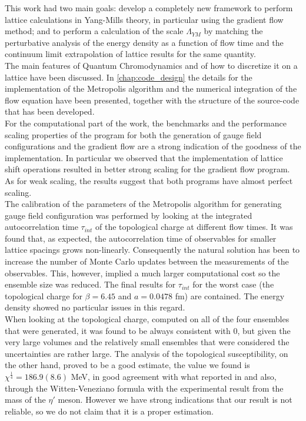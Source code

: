 This work had two main goals: develop a completely new framework to perform lattice calculations in Yang-Mills theory, in particular using the gradient flow method; and to perform a calculation of the scale $\Lambda_{YM}$ by matching the perturbative analysis of the energy density as a function of flow time and the continuum limit extrapolation of lattice results for the same quantity.\\

The main features of Quantum Chromodynamics and of how to discretize it on a lattice have been discussed. In \cref{chap:code_design} the details for the implementation of the Metropolis algorithm and the numerical integration of the flow equation have been presented, together with the structure of the source-code that has been developed. \\
For the computational part of the work, the benchmarks and the performance scaling properties of the program for both the generation of gauge field configurations and the gradient flow are a strong indication of the goodness of the implementation. In particular we observed that the implementation of lattice shift operations resulted in better strong scaling for the gradient flow program. As for weak scaling, the results suggest that both programs have almost perfect scaling. \\
The calibration of the parameters of the Metropolis algorithm for generating gauge field configuration was performed by looking at the integrated autocorrelation time $\tau_{int}$ of the topological charge at different flow times. It was found that, as expected, the autocorrelation time of observables for smaller lattice spacings grows non-linearly. Consequently the natural solution has been to increase the number of Monte Carlo updates between the measurements of the observables. This, however, implied a much larger computational cost so the ensemble size was reduced. The final results for $\tau_{int}$ for the worst case (the topological charge for $\beta = 6.45$ and $a=0.0478$ fm) are contained. The energy density showed no particular issues in this regard.\\
When looking at the topological charge, computed on all of the four ensembles that were generated, it was found to be always consistent with 0, but given the very large volumes and the relatively small ensembles that were considered the uncertainties are rather large. The analysis of the topological susceptibility, on the other hand, proved to be a good estimate, the value we found is $\chi^{\frac{1}{4}} = 186.9(8.6)$ MeV, in good agreement with what reported in \cite{luscher_properties_2010,shindler_nucleon_2015} and also, through the Witten-Veneziano formula with the experimental result from the mass of the $\eta'$ meson. However we have strong indications that our result is not reliable, so we do not claim that it is a proper estimation.\\

